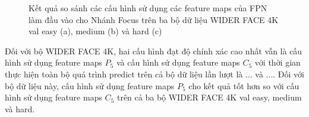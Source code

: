 {    \begin{figure}[H]
        \centering
        \caption{Kết quả so sánh các cấu hình sử dụng các feature maps  của FPN làm đầu vào cho Nhánh Focus  trên ba bộ dữ liệu WIDER FACE 4K val easy (a), medium (b) và hard (c)}
        \label{fig:retinafocus_widerface_4k_val_fpn}
    \end{figure}

    \noindent
    Đối với bộ WIDER FACE 4K, hai cấu hình đạt độ chính xác cao nhất vẫn là cấu hình sử dụng feature maps  ${P}_{5}$ và cấu hình sử dụng feature maps  ${C}_{5}$ với thời gian thực hiện toàn bộ quá trình predict trên cả bộ dữ liệu lần lượt là ... và ....
    Đối với bộ dữ liệu này, cấu hình sử dụng feature maps  ${P}_{5}$ cho kết quả tốt hơn so với cấu hình sử dụng feature maps  ${C}_{5}$ trên cả ba bộ WIDER FACE 4K val easy, medium và hard.

}

